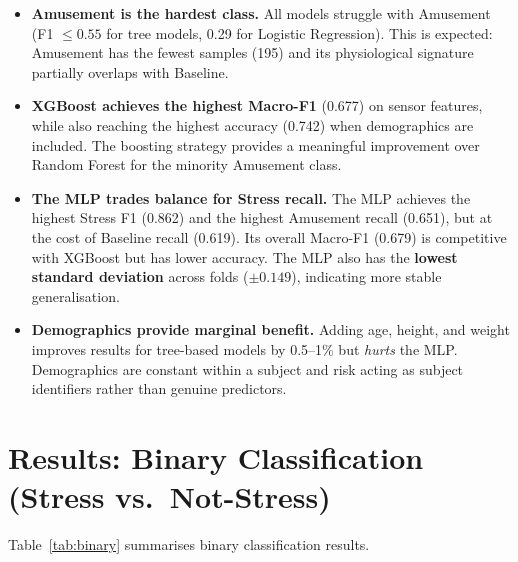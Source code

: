 \documentclass[11pt]{article}
\begin{document}
\begin{itemize}
    \item \textbf{Amusement is the hardest class.}
    All models struggle with Amusement (F1 $\leq 0.55$ for tree models, 0.29 for Logistic Regression).
    This is expected: Amusement has the fewest samples (195) and its physiological signature partially overlaps with Baseline.

    \item \textbf{XGBoost achieves the highest Macro-F1} (0.677) on sensor features, while also reaching the highest accuracy (0.742) when demographics are included.
    The boosting strategy provides a meaningful improvement over Random Forest for the minority Amusement class.

    \item \textbf{The MLP trades balance for Stress recall.}
    The MLP achieves the highest Stress F1 (0.862) and the highest Amusement recall (0.651), but at the cost of Baseline recall (0.619).
    Its overall Macro-F1 (0.679) is competitive with XGBoost but has lower accuracy.
    The MLP also has the \textbf{lowest standard deviation} across folds ($\pm 0.149$), indicating more stable generalisation.

    \item \textbf{Demographics provide marginal benefit.}
    Adding age, height, and weight improves results for tree-based models by 0.5--1\% but \emph{hurts} the MLP.
    Demographics are constant within a subject and risk acting as subject identifiers rather than genuine predictors.
\end{itemize}


\section{Results: Binary Classification (Stress vs.\ Not-Stress)}
\label{sec:results-binary}

Table~\ref{tab:binary} summarises binary classification results.
\end{document}
